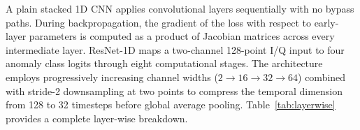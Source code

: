 \documentclass[conference]{IEEEtran}
\begin{document}
A plain stacked 1D CNN applies convolutional layers sequentially with no bypass paths. During backpropagation, the gradient of the loss with respect to early-layer parameters is computed as a product of Jacobian matrices across every intermediate layer.
ResNet-1D maps a two-channel 128-point I/Q input to four anomaly class logits through eight computational stages. The architecture employs progressively increasing channel widths ($2 \rightarrow 16 \rightarrow 32 \rightarrow 64$) combined with stride-2 downsampling at two points to compress the temporal dimension from 128 to 32 timesteps before global average pooling. Table~\ref{tab:layerwise} provides a complete layer-wise breakdown.
\end{document}
